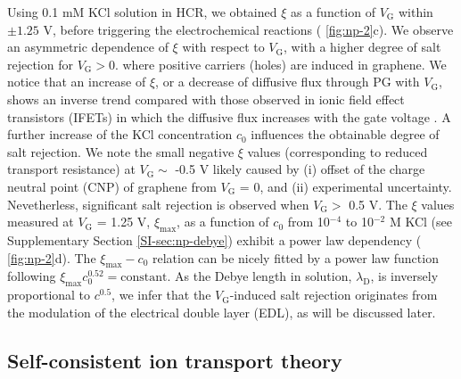 Using 0.1 mM KCl solution in HCR, we obtained $\xi$ as a function of
$V_{\mathrm{G}}$ within $\pm1.25$ V, before triggering the
electrochemical reactions ( \autoref{fig:np-2}c). We observe an
asymmetric dependence of $\xi$ with respect to $V_{\mathrm{G}}$, with
a higher degree of salt rejection for $V_{\mathrm{G}}>0$. where
positive carriers (holes) are induced in graphene. We notice that an
increase of $\xi$, or a decrease of diffusive flux through PG with
$V_{\mathrm{G}}$, shows an inverse trend compared with those
observed in ionic field effect transistors (IFETs) in which the
diffusive flux increases with the gate voltage
\cite{Nam_2009_IFET_sub10nm,Cheng_2018_gate_gox}. A further increase of the KCl
concentration $c_{0}$ influences the obtainable degree of salt
rejection. 
{
We note the small negative $\xi$ values (corresponding to reduced transport resistance) at $V_{\mathrm{G}} \sim{}$ -0.5 V
likely caused by (i) offset of the charge neutral point (CNP) of graphene from $V_{\mathrm{G}}$ = 0, and (ii) experimental uncertainty.
Nevetherless, significant salt rejection is observed when $V_{\mathrm{G}}>$ 0.5 V.
}
The $\xi$ values measured at $V_{\mathrm{G}}$ = 1.25 V,
$\xi_{\mathrm{max}}$, as a function of $c_{0}$ from 10$^{-4}$ to
10$^{-2}$ M KCl (see Supplementary Section \autoref{SI-sec:np-debye}) exhibit
a power law dependency ( \autoref{fig:np-2}d). The
$\xi_{\mathrm{max}}-c_{0}$ relation can be nicely fitted by a power
law function following
$\xi_{\mathrm{max}} c_{0}^{0.52} = \mathrm{constant}$. As the Debye
length in solution, $\lambda_{\mathrm{D}}$, is inversely proportional
to $c^{0.5}$, we infer that the $V_{\mathrm{G}}$-induced salt
rejection originates from the modulation of the electrical double
layer (EDL), as will be discussed later.

\subsection{Self-consistent ion transport theory}
\label{sec:np-theory}

